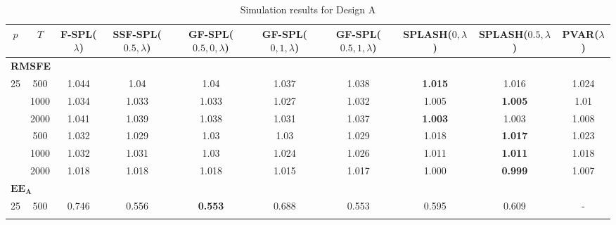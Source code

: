 \begin{landscape}
    \bgroup
    \def\arraystretch{1.3}
    \begin{table}[p]
    \footnotesize
    \centering
    \caption{Simulation results for Design A}
    \label{tab:results_designA}
    \begin{tabular}{cccccccccc}    
    \hline \hline
    $p$  &  $T$   &  F-SPL($\lambda$)  & SSF-SPL($0.5, \lambda$)  &  GF-SPL($0.5, 0, \lambda$)  &  GF-SPL($0, 1, \lambda$)  &  GF-SPL($0.5, 1, \lambda$)  &  SPLASH($0, \lambda$)  &  SPLASH($0.5, \lambda$)  &  PVAR($\lambda$)  \\
    \hline
    \multicolumn{10}{l}{\textbf{RMSFE}} \\
	\hline
	 25  & 500  &       1.044        &           1.04            &            1.04             &           1.037           &            1.038            & \textbf{1.015}         & 1.016                    &       1.024       \\ \hdashline
	 25  & 1000 &       1.034        &           1.033           &            1.033            &           1.027           &            1.032            & 1.005                  & \textbf{1.005}           &       1.01        \\ \hdashline
	 25  & 2000 &       1.041        &           1.039           &            1.038            &           1.031           &            1.037            & \textbf{1.003}         & 1.003                    &       1.008       \\ \hdashline
	 36  & 500  &       1.032        &           1.029           &            1.03             &           1.03            &            1.029            & 1.018                  & \textbf{1.017}           &       1.023       \\ \hdashline
	 36  & 1000 &       1.032        &           1.031           &            1.03             &           1.024           &            1.026            & 1.011                  & \textbf{1.011}           &       1.018       \\ \hdashline
	 36  & 2000 &       1.018        &           1.018           &            1.018            &           1.015           &            1.017            & 1.000                  & \textbf{0.999}           &       1.007       \\
	\hline
	\multicolumn{10}{l}{$\mathbf{EE_A}$} \\
	\hline
	 25  & 500  &       0.746        &           0.556           & \textbf{0.553}              &           0.688           &            0.553            &         0.595          &          0.609           & -                 \\ \hdashline

\end{tabular}
\end{table}
\end{landscape}
